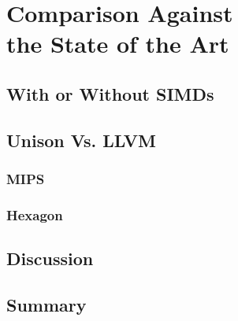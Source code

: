 %

\chapter[Comparison Against the State of the Art]%
        {Comparison Against\\ the State of the Art}

\section{With or Without SIMDs}
\section{Unison Vs. LLVM}
\subsection{MIPS}
\subsection{Hexagon}
\section{Discussion}
\section{Summary}
